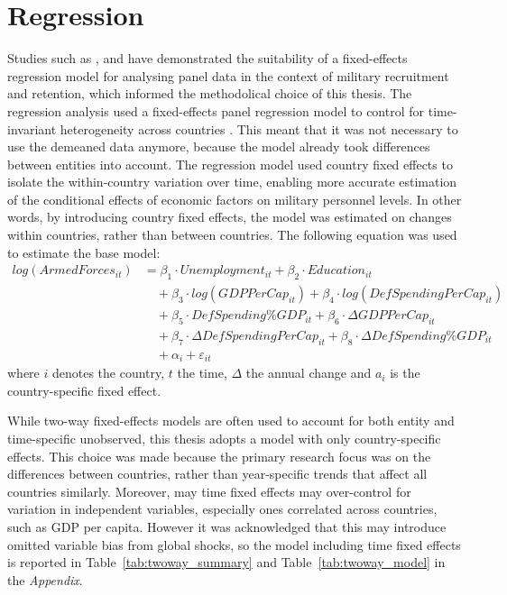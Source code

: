 \section{Regression}

Studies such as \textcite{asch_cash_2010}, \textcite{backstrom_are_2019} and 
\textcite{balcaen_unemployment_2025} have demonstrated the suitability of a fixed-effects 
regression model for analysing panel data in the context of military recruitment and retention, 
which informed the methodolical choice of this thesis.
The regression analysis used a fixed-effects panel regression model to control for time-invariant 
heterogeneity across countries \parencite{backstrom_are_2019}. This meant that it was not 
necessary to use the demeaned data anymore, 
because the model already took differences between entities into account.
The regression model used country fixed effects to isolate the within-country variation over time, 
enabling more accurate 
estimation of the conditional effects of economic factors on military personnel levels.
In other words, by introducing country fixed effects, the model was estimated on changes within 
countries, rather than between countries.
The following equation was used to estimate the base model:
\begin{align*}
log(ArmedForces_{it}) &= \beta_1 \cdot Unemployment_{it} 
+ \beta_2 \cdot Education_{it} \\
&\quad + \beta_3 \cdot log(GDPPerCap_{it}) 
+ \beta_4 \cdot log(DefSpendingPerCap_{it}) \\
&\quad + \beta_5 \cdot DefSpending\%GDP_{it} 
+ \beta_6 \cdot \Delta GDPPerCap_{it} \\
&\quad + \beta_7 \cdot \Delta DefSpendingPerCap_{it} 
+ \beta_8 \cdot \Delta DefSpending\%GDP_{it} \\
&\quad + \alpha_i + \varepsilon_{it}
\end{align*}
where $i$ denotes the country, $t$ the time, $\Delta$ the annual change and 
$a_i$ is the country-specific fixed effect.

While two-way fixed-effects models are often used to account for both entity and time-specific 
unobserved, this thesis adopts a model with only country-specific effects.
This choice was made because the primary research focus was on the differences between countries,
rather than year-specific trends that affect all countries similarly. Moreover, may time fixed 
effects may over-control for variation in independent variables, especially ones correlated 
across countries, such as GDP per capita. However it was acknowledged that this may 
introduce omitted variable bias from global shocks, so the model including time fixed effects 
is reported in Table~\ref{tab:twoway_summary} and Table~\ref{tab:twoway_model} in the \textit{Appendix}.

